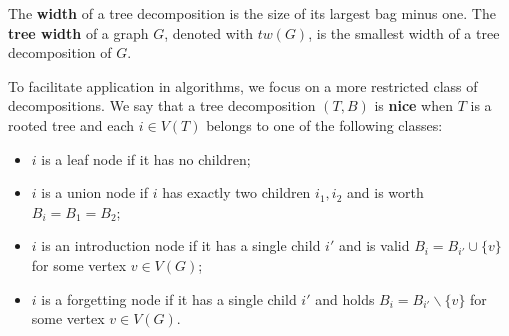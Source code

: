 
The \textbf{width} of a tree decomposition is the size of its largest bag minus one. The \textbf{tree width} of a graph \(G\), denoted with \(tw(G)\), is the smallest width of a tree decomposition of \(G\).

To facilitate application in algorithms, we focus on a more restricted class of decompositions. We say that a tree decomposition \((T, B)\) is \textbf{nice} when \(T\) is a rooted tree and each \(i \in V(T)\) belongs to one of the following classes:



\begin{itemize}
    \item \(i\) is a leaf node if it has no children;
    \item \(i\) is a union node if \(i\) has exactly two children \(i_1, i_2\) and is worth \(B_i = B_1 = B_2\);
    \item \(i\) is an introduction node if it has a single child \(i'\) and is valid \(B_i = B_{i'} \cup \{v\}\) for some vertex \(v \in V(G)\);
    \item \(i\) is a forgetting node if it has a single child \(i'\) and holds \(B_i = B_{i'} \backslash \{v\}\) for some vertex \(v \in V(G)\).
\end{itemize}


